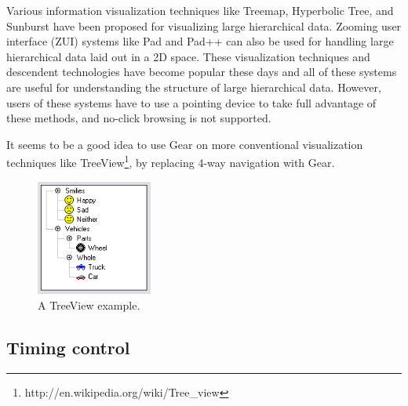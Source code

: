 \documentclass[conference]{IEEEtran}
\begin{document}
Various information visualization techniques like
Treemap\cite{Johnson:1991:TSA:949607.949654},
Hyperbolic Tree\cite{Lamping:1995:FTB:223904.223956},
and Sunburst\cite{Stasko:2000:FDN:857190.857683}
have been proposed for visualizing large hierarchical data.
Zooming user interface (ZUI) systems like
Pad\cite{Perlin:1993:PAA:166117.166125} and
Pad++\cite{Bederson:1994:PZG:192426.192435}
can also be used for handling large hierarchical data laid out in a 2D space.
%
These visualization techniques and descendent technologies have become popular these days and
all of these systems are useful for understanding the structure of
large hierarchical data.
However, users of these systems have to use a pointing device
to take full advantage of these methods, and
no-click browsing is not supported.



It seems to be a good idea to use Gear on more conventional visualization techniques like
TreeView\footnote{
  \textsf{http://en.wikipedia.org/wiki/Tree\_view}
}, by replacing 4-way navigation with Gear.

\begin{figure}[H]
\centerline{
  \includegraphics[width=38mm,bb=0 0 188 188]{figures/treeview.png}
}
\caption{A TreeView example.}
\label{treeview}
\end{figure}


\subsection{Timing control}
\end{document}
